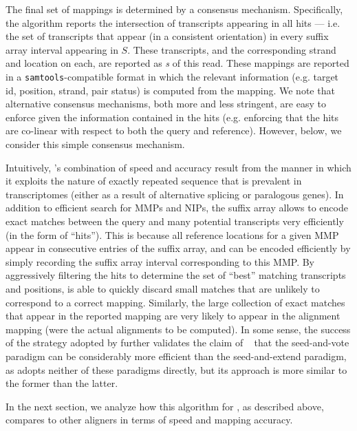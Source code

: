 The final set of mappings is determined by a consensus mechanism. Specifically, the algorithm reports the intersection of transcripts appearing in all hits --- i.e. the set of transcripts that appear (in a consistent orientation) in every suffix array interval appearing in $S$. These transcripts, and the corresponding strand and location on each, are reported as \textit{\qm}\textit{s} of this read. These mappings are reported in a \texttt{samtools}-compatible format in which the relevant information (e.g. target id, position, strand, pair status) is computed from the mapping. We note that alternative consensus mechanisms, both more and less stringent, are easy to enforce given the information contained in the hits (e.g. enforcing that the hits are co-linear with respect to both the query and reference).  However, below, we consider this simple consensus mechanism. 

Intuitively, \rapmap's combination of speed and accuracy result from the manner in which it exploits the nature of exactly repeated sequence that is prevalent in transcriptomes (either as a result of alternative splicing or paralogous genes).  In addition to efficient search for MMPs and NIPs, the suffix array allows \rapmap to encode exact matches between the query and many potential transcripts very efficiently (in the form of ``hits'').  This is because all reference locations for a given MMP appear in consecutive entries of the suffix array, and can be encoded efficiently by simply recording the suffix array interval corresponding to this MMP. By aggressively filtering the hits to determine the set of ``best'' matching transcripts and positions, \rapmap is able to quickly discard small matches that are unlikely to correspond to a correct mapping. Similarly, the large collection of exact matches that appear in the reported mapping are very likely to appear in the alignment mapping (were the actual alignments to be computed).  In some sense, the success of the strategy adopted by \rapmap further validates the claim of ~\citet{liao2013subread} that the  seed-and-vote paradigm can be considerably more efficient than the seed-and-extend paradigm, as \rapmap adopts neither of these paradigms directly, but its approach is more similar to the former than the latter.

In the next section, we analyze how this algorithm for \qm, as described above, compares to other aligners in terms of speed and mapping accuracy.

